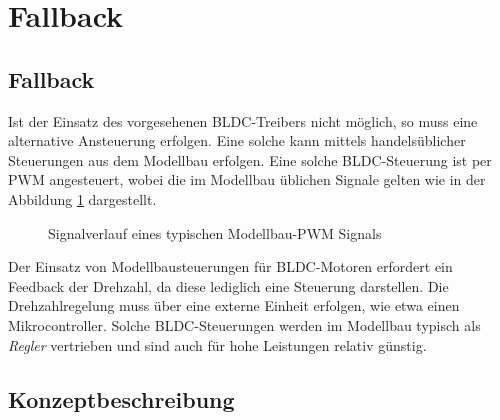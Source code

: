 \ifSTANDALONE
\section{Fallback}
\fi
\ifEMBED
\subsection{Fallback}
\fi
Ist der Einsatz des vorgesehenen BLDC-Treibers nicht möglich, so muss eine
alternative Ansteuerung erfolgen. Eine solche kann mittels handelsüblicher
Steuerungen aus dem Modellbau erfolgen. Eine solche BLDC-Steuerung ist per
PWM angesteuert, wobei die im Modellbau üblichen Signale gelten wie in der
Abbildung \ref{fig:rc-pwm} dargestellt.

\ifSTANDALONE
\begin{figure}[h!]
	\centering
	\caption{Signalverlauf eines typischen Modellbau-PWM Signals}
	\label{fig:rc-pwm}
\end{figure}
\fi

Der Einsatz von Modellbausteuerungen für BLDC-Motoren erfordert ein
Feedback der Drehzahl, da diese lediglich eine Steuerung darstellen. Die
Drehzahlregelung muss über eine externe Einheit erfolgen, wie etwa einen
Mikrocontroller. Solche BLDC-Steuerungen werden im Modellbau typisch als
\emph{Regler} vertrieben und sind auch für hohe Leistungen relativ günstig.

\ifSTANDALONE
\subsection{Konzeptbeschreibung}
\fi
\ifEMBED
